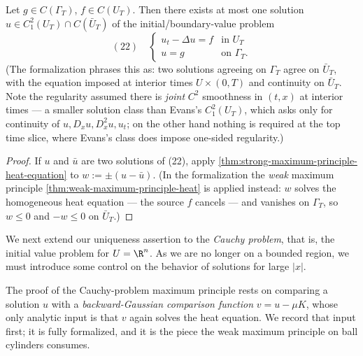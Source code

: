 \begin{theorem}
\label{thm:uniqueness-heat-bounded-domain}
\leanok
Let $g \in C(\Gamma_T)$, $f \in C(U_T)$. Then there exists at most one solution $u \in C_1^2(U_T) \cap C(\bar{U}_T)$ of the initial/boundary-value problem
$$(22) \quad \begin{cases}
u_t - \Delta u = f & \text{in } U_T \\
u = g & \text{on } \Gamma_T.
\end{cases}$$
(The formalization phrases this as: two solutions agreeing on $\Gamma_T$ agree on
$\bar{U}_T$, with the equation imposed at interior times $U \times (0,T)$ and
continuity on $\bar{U}_T$. Note the regularity assumed there is \emph{joint}
$C^2$ smoothness in $(t,x)$ at interior times — a smaller solution class than
Evans's $C_1^2(U_T)$, which asks only for continuity of $u, D_x u, D_x^2 u, u_t$;
on the other hand nothing is required at the top time slice, where Evans's class
does impose one-sided regularity.)
\end{theorem}

\begin{proof}
\leanok
If $u$ and $\bar{u}$ are two solutions of (22), apply \cref{thm:strong-maximum-principle-heat-equation} to $w := \pm(u - \bar{u})$. (In the formalization the \emph{weak} maximum principle \cref{thm:weak-maximum-principle-heat} is applied instead: $w$ solves the homogeneous heat equation — the source $f$ cancels — and vanishes on $\Gamma_T$, so $w \le 0$ and $-w \le 0$ on $\bar{U}_T$.)
\end{proof}

We next extend our uniqueness assertion to the \textit{Cauchy problem}, that is, the initial value problem for $U = \R^n$. As we are no longer on a bounded region, we must introduce some control on the behavior of solutions for large $|x|$.

The proof of the Cauchy-problem maximum principle rests on comparing a solution $u$ with a
\emph{backward-Gaussian comparison function} $v = u - \mu K$, whose only analytic input is
that $v$ again solves the heat equation. We record that input first; it is fully
formalized, and it is the piece the weak maximum principle on ball cylinders consumes.

